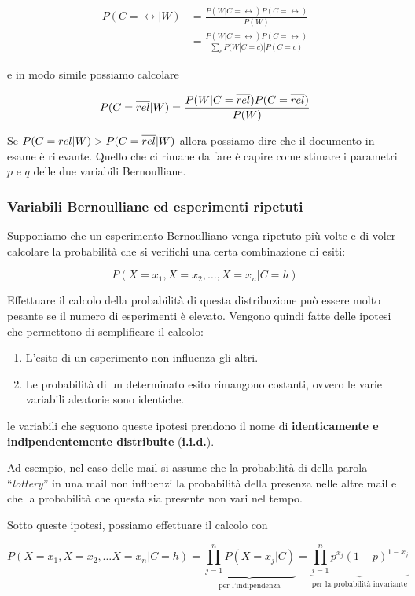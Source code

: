 \begin{align*}
	P(C=\rel |W) &= \frac{P(W|C=\rel)P(C = \rel)}{P(W)} \\
	             &= \frac{P(W|C=\rel)P(C = \rel)}{\sum\limits_c P(W|C = c)|P(C = c)}
\end{align*}

e in modo simile possiamo calcolare

$$
	P(C=\overline{rel} |W) = \frac{P(W|C=\overline{rel})P(C = \overline{rel})}{P(W)}
$$

Se $P(C=rel |W) > P(C=\overline{rel} |W)$ allora possiamo dire che il documento in esame è rilevante.
Quello che ci rimane da fare è capire come stimare i parametri $p$ e $q$ delle due variabili Bernoulliane.

\subsubsection{Variabili Bernoulliane ed esperimenti ripetuti}

Supponiamo che un esperimento Bernoulliano venga ripetuto più volte e di voler calcolare la probabilità che si verifichi una certa combinazione di esiti:

$$
P(X = x_1, X=x_2, \ldots, X = x_n | C = h)
$$

\noindent Effettuare il calcolo della probabilità di questa distribuzione può essere molto pesante se il numero di esperimenti è elevato.
Vengono quindi fatte delle ipotesi che permettono di semplificare il calcolo:

\begin{enumerate}
	\item L'esito di un esperimento non influenza gli altri.
	\item Le probabilità di un determinato esito rimangono costanti, ovvero le varie variabili aleatorie sono identiche.
\end{enumerate}

\noindent le variabili che seguono queste ipotesi prendono il nome di \textbf{identicamente e indipendentemente distribuite} (\textbf{i.i.d.}).

Ad esempio, nel caso delle mail si assume che la probabilità di della parola ``\textit{lottery}'' in una mail non influenzi la probabilità della presenza nelle altre mail e che la probabilità che questa sia presente non vari nel tempo.

Sotto queste ipotesi, possiamo effettuare il calcolo con

$$
P(X = x_1, X=x_2, \ldots X = x_n | C = h) = \underbrace{\prod\limits_{j = 1}^{n} P(X = x_j | C)}_{\text{per l'indipendenza}} = \underbrace{\prod\limits_{i = 1}^{n} p^{x_j}(1-p)^{1-{x_j}}}_{\text{per la probabilità invariante}}
$$

